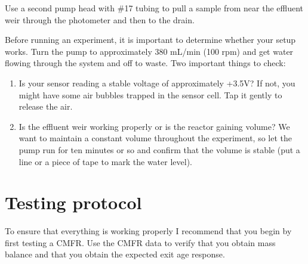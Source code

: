 \documentclass[letterpaper,10pt,english]{sphinxmanual}
\begin{document}
Use a second pump head with \#17 tubing to pull a sample from near the effluent weir through the photometer and then to the drain.

Before running an experiment, it is important to determine whether your setup works. Turn the pump to approximately 380 mL/min (100 rpm) and get water flowing through the system and off to waste. Two important things to check:
\begin{enumerate}
\item {} 
Is your sensor reading a stable voltage of approximately +3.5V? If not, you might have some air bubbles trapped in the sensor cell. Tap it gently to release the air.

\item {} 
Is the effluent weir working properly or is the reactor gaining volume? We want to maintain a constant volume throughout the experiment, so let the pump run for ten minutes or so and confirm that the volume is stable (put a line or a piece of tape to mark the water level).

\end{enumerate}


\section{Testing protocol}
\label{\detokenize{Reactor_Characteristics/Reactor_Characteristics:testing-protocol}}\label{\detokenize{Reactor_Characteristics/Reactor_Characteristics:heading-reactor-testing-protocol}}
To ensure that everything is working properly I recommend that you begin by first testing a CMFR. Use the CMFR data to verify that you obtain mass balance and that you obtain the expected exit age response.
\end{document}
